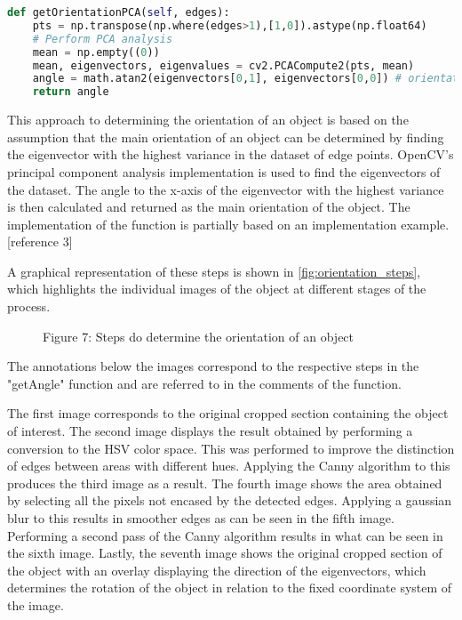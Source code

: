 \begin{lstlisting}[language=python]
def getOrientationPCA(self, edges):
    pts = np.transpose(np.where(edges>1),[1,0]).astype(np.float64)
    # Perform PCA analysis
    mean = np.empty((0))
    mean, eigenvectors, eigenvalues = cv2.PCACompute2(pts, mean)
    angle = math.atan2(eigenvectors[0,1], eigenvectors[0,0]) # orientation in radians
    return angle
\end{lstlisting}
This approach to determining the orientation of an object is based on the assumption that the main orientation of an object can be determined by finding the eigenvector with the highest variance in the dataset of edge points. OpenCV's principal component analysis implementation is used to find the eigenvectors of the dataset. The angle to the x-axis of the eigenvector with the highest variance is then calculated and returned as the main orientation of the object. The implementation of the function is partially based on an implementation example. [reference 3]

A graphical representation of these steps is shown in \vref{fig:orientation_steps}, which highlights the individual images of the object at different stages of the process. 

\begin{figure}[!h]
    \centering
    \caption{Figure 7: Steps do determine the orientation of an object }
    \label{fig:orientation_steps}
\end{figure}

The annotations below the images correspond to the respective steps in the "getAngle" function and are referred to in the comments of the function.

The first image corresponds to the original cropped section containing the object of interest. The second image displays the result obtained by performing a conversion to the HSV color space. This was performed to improve the distinction of edges between areas with different hues. Applying the Canny algorithm to this produces the third image as a result. The fourth image shows the area obtained by selecting all the pixels not encased by the detected edges. Applying a gaussian blur to this results in smoother edges as can be seen in the fifth image. Performing a second pass of the Canny algorithm results in what can be seen in the sixth image. Lastly, the seventh image shows the original cropped section of the object with an overlay displaying the direction of the eigenvectors, which determines the rotation of the object in relation to the fixed coordinate system of the image.

